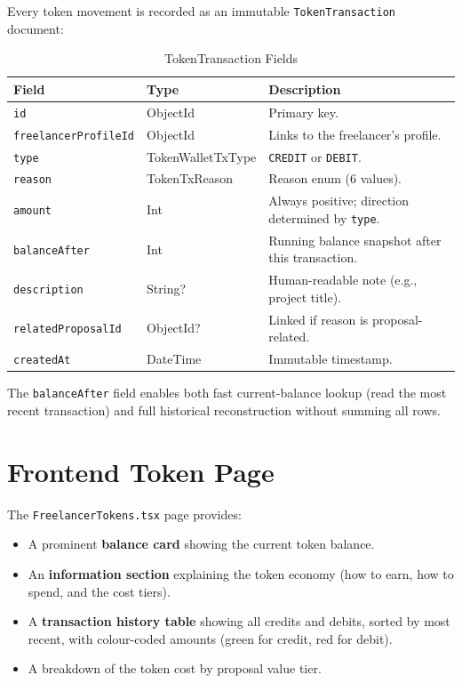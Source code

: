Every token movement is recorded as an immutable \texttt{TokenTransaction} document:

\begin{table}[H]
\centering
\caption{TokenTransaction Fields}
\begin{tabularx}{\textwidth}{llX}
\toprule
\textbf{Field} & \textbf{Type} & \textbf{Description} \\
\midrule
\texttt{id}                  & ObjectId               & Primary key. \\
\texttt{freelancerProfileId} & ObjectId               & Links to the freelancer's profile. \\
\texttt{type}                & TokenWalletTxType      & \texttt{CREDIT} or \texttt{DEBIT}. \\
\texttt{reason}              & TokenTxReason          & Reason enum (6 values). \\
\texttt{amount}              & Int                    & Always positive; direction determined by \texttt{type}. \\
\texttt{balanceAfter}        & Int                    & Running balance snapshot after this transaction. \\
\texttt{description}         & String?                & Human-readable note (e.g., project title). \\
\texttt{relatedProposalId}   & ObjectId?              & Linked if reason is proposal-related. \\
\texttt{createdAt}           & DateTime               & Immutable timestamp. \\
\bottomrule
\end{tabularx}
\end{table}

The \texttt{balanceAfter} field enables both fast current-balance lookup (read the most recent transaction) and full historical reconstruction without summing all rows.

\section{Frontend Token Page}

The \texttt{FreelancerTokens.tsx} page provides:

\begin{itemize}
  \item A prominent \textbf{balance card} showing the current token balance.
  \item An \textbf{information section} explaining the token economy (how to earn, how to spend, and the cost tiers).
  \item A \textbf{transaction history table} showing all credits and debits, sorted by most recent, with colour-coded amounts (green for credit, red for debit).
  \item A breakdown of the token cost by proposal value tier.
\end{itemize}

